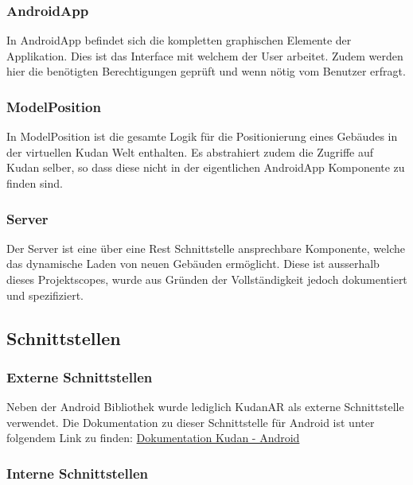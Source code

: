 \documentclass[a4paper]{scrreprt}
\begin{document}
\subsubsection{AndroidApp}
In AndroidApp befindet sich die kompletten graphischen Elemente der Applikation. Dies ist das Interface mit welchem der User arbeitet. Zudem werden hier die benötigten Berechtigungen geprüft und wenn nötig vom Benutzer erfragt.

\subsubsection{ModelPosition}
In ModelPosition ist die gesamte Logik für die Positionierung eines Gebäudes in der virtuellen Kudan Welt enthalten. Es abstrahiert zudem die Zugriffe auf Kudan selber, so dass diese nicht in der eigentlichen AndroidApp Komponente zu finden sind.

\subsubsection{Server}
Der Server ist eine über eine Rest Schnittstelle ansprechbare Komponente, welche das dynamische Laden von neuen Gebäuden ermöglicht. Diese ist ausserhalb dieses Projektscopes, wurde aus Gründen der Vollständigkeit jedoch dokumentiert und spezifiziert.

\subsection{Schnittstellen}
\subsubsection{Externe Schnittstellen}
Neben der Android Bibliothek wurde lediglich KudanAR als externe Schnittstelle verwendet. Die Dokumentation zu dieser Schnittstelle für Android ist unter folgendem Link zu finden:
\href{https://www.kudan.eu/docs-reference/AndroidDocs/annotated.html}{Dokumentation Kudan - Android}


\subsubsection{Interne Schnittstellen}
\end{document}
